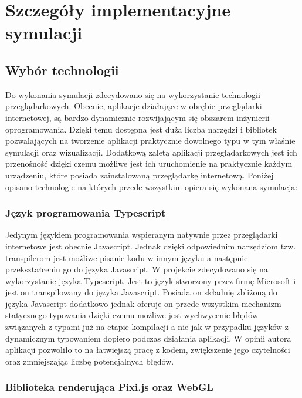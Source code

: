 \chapter{Szczegóły implementacyjne symulacji}
\label{cha:symulacja}

\section{Wybór technologii}

Do wykonania symulacji zdecydowano się na wykorzystanie technologii przeglądarkowych. Obecnie, aplikacje działające w obrębie przeglądarki internetowej, są bardzo dynamicznie rozwijającym się obszarem inżynierii oprogramowania. Dzięki temu dostępna jest duża liczba narzędzi i bibliotek pozwalających na tworzenie aplikacji praktycznie dowolnego typu w tym właśnie symulacji oraz wizualizacji. Dodatkową zaletą aplikacji przeglądarkowych jest ich przenośność dzięki czemu możliwe jest ich uruchomienie na praktycznie każdym urządzeniu, które posiada zainstalowaną przeglądarkę internetową.
Poniżej opisano technologie na których przede wszystkim opiera się wykonana symulacja:

\subsection{Język programowania Typescript}

Jedynym językiem programowania wspieranym natywnie przez przeglądarki internetowe jest obecnie Javascript. Jednak dzięki odpowiednim narzędziom tzw. transpilerom jest możliwe pisanie kodu w innym języku a następnie przekształceniu go do języka Javascript.
W projekcie zdecydowano się na wykorzystanie języka Typescript. Jest to język stworzony przez firmę Microsoft i jest on transpilowany do języka Javascript. Posiada on składnię zbliżoną do języka Javascript dodatkowo jednak oferuje on przede wszystkim mechanizm statycznego typowania dzięki czemu możliwe jest wychwycenie błędów związanych z typami już na etapie kompilacji a nie jak w przypadku języków z dynamicznym typowaniem dopiero podczas działania aplikacji. W opinii autora aplikacji pozwoliło to na łatwiejszą pracę z kodem, zwiększenie jego czytelności oraz zmniejszając liczbę potencjalnych błędów.

\subsection{Biblioteka renderująca Pixi.js oraz WebGL}

